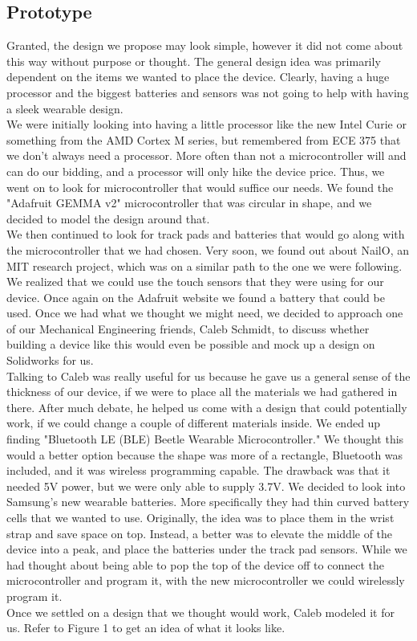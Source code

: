 \documentclass[12pt,letterpaper]{article}
\begin{document}
\subsection*{Prototype}
\hspace{1cm}Granted, the design we propose may look simple, however it did not come about this way without purpose or thought. The general design idea was primarily dependent on the items we wanted to place the device. Clearly, having a huge processor and the biggest batteries and sensors was not going to help with having a sleek wearable design.\\
\hspace{1cm}We were initially looking into having a little processor like the new Intel Curie or something from the AMD Cortex M series, but remembered from ECE 375 that we don't always need a processor. More often than not a microcontroller will and can do our bidding, and a processor will only hike the device price. Thus, we went on to look for microcontroller that would suffice our needs. We found the "Adafruit GEMMA v2" microcontroller that was circular in shape, and we decided to model the design around that.\\
We then continued to look for track pads and batteries that would go along with the microcontroller that we had chosen. Very soon, we found out about NailO, an MIT research project, which was on a similar path to the one we were following. We realized that we could use the touch sensors that they were using for our device. Once again on the Adafruit website we found a battery that could be used. Once we had what we thought we might need, we decided to approach one of our Mechanical Engineering friends, Caleb Schmidt, to discuss whether building a device like this would even be possible and mock up a design on Solidworks for us.\\
Talking to Caleb was really useful for us because he gave us a general sense of the thickness of our device, if we were to place all the materials we had gathered in there. After much debate, he helped us come with a design that could potentially work, if we could change a couple of different materials inside. We ended up finding "Bluetooth LE (BLE) Beetle Wearable Microcontroller." We thought this would a better option because the shape was more of a rectangle, Bluetooth was included, and it was wireless programming capable. The drawback was that it needed 5V power, but we were only able to supply 3.7V. We decided to look into Samsung's new wearable batteries. More specifically they had thin curved battery cells that we wanted to use. Originally, the idea was to place them in the wrist strap and save space on top. Instead, a better was to elevate the middle of the device into a peak, and place the batteries under the track pad sensors. While we had thought about being able to pop the top of the device off to connect the microcontroller and program it, with the new microcontroller we could wirelessly program it.\\
Once we settled on a design that we thought would work, Caleb modeled it for us. Refer to Figure 1 to get an idea of what it looks like.
\end{document}
